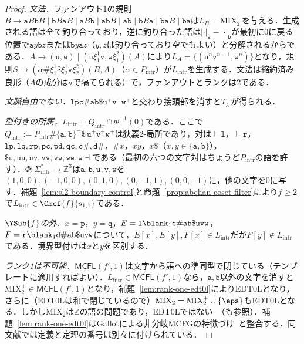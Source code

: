 \begin{proof}
\emph{文法．}ファンアウト1の規則$B\to\mathtt aB\mathtt bB\mid\mathtt bB\mathtt aB\mid\mathtt aB\mathtt b\mid\mathtt{ab}B\mid\mathtt{ab}\mid\mathtt bB\mathtt a\mid\mathtt{ba}B\mid\mathtt{ba}$は$L_B=\mathrm{MIX}_2^+$を与える．生成される語は全て釣り合っており，逆に釣り合った語は$|\cdot|_{\mathtt a}-|\cdot|_{\mathtt b}$が最初に0に戻る位置で$\mathtt ay\mathtt bz$または$\mathtt by\mathtt az$（$y,z$は釣り合っており空でもよい）と分解されるからである．$A\to(\mathtt u,\mathtt w)\mid(\mathtt u\xi_1^1\mathtt v,\mathtt w\xi_1^2)(A)$により$L_A=\{(\mathtt u^n\mathtt v^{n-1},\mathtt w^n)\}$となり，規則$S\to(\alpha\mathtt\#\xi_1^1\mathtt\$\xi_2^1\mathtt v\xi_2^2)(B,A)$（$\alpha\in P_{\mathrm{intr}}$）が$L_{\mathrm{intr}}$を生成する．文法は縮約済み良形（$A$の成分は$\mathtt v$で隔てられる）で，ファンアウトとランクは2である．

\emph{文脈自由でない．}$\mathtt{lpc\#ab\$}\mathtt u^+\mathtt v^+\mathtt w^+$と交わり接頭部を消すと$T_3^+$が得られる．

\emph{型付きの所属．}$L_{\mathrm{intr}}=Q_{\mathrm{intr}}\cap\Phi^{-1}(0)$である．ここで$Q_{\mathrm{intr}}:=P_{\mathrm{intr}}\mathtt\#\{\mathtt a,\mathtt b\}^+\mathtt\$\,\mathtt u^+\mathtt v^+\mathtt w^+$は狭義2-局所であり，対は$\vdash\mathtt l$，$\vdash\mathtt r$，$\mathtt{lp},\mathtt{lq},\mathtt{rp},\mathtt{pc},\mathtt{pd},\mathtt{qc},\mathtt{c\#},\mathtt{d\#}$，$\mathtt{\#}x$，$xy$，$x\mathtt\$$（$x,y\in\{\mathtt a,\mathtt b\}$），$\mathtt{\$u},\mathtt{uu},\mathtt{uv},\mathtt{vv},\mathtt{vw},\mathtt{ww},\mathtt w\dashv$である（最初の六つの文字対はちょうど$P_{\mathrm{intr}}$の語を許す）．$\Phi:\Sigma_{\mathrm{intr}}^*\to\mathbb Z^3$は$\mathtt a,\mathtt b,\mathtt u,\mathtt v,\mathtt w$を$(1,0,0),(-1,0,0),(0,1,0),(0,-1,1),(0,0,-1)$に，他の文字を$0$に写す．補題~\ref{lem:sl2-boundary-control}と命題~\ref{prop:abelian-coset-filter}により$f\ge2$で$L_{\mathrm{intr}}\in\Cmcf{f}{s_{1,1}}$である．

\emph{$\YSub{f}$の外．}$x=\mathtt p$，$y=\mathtt q$，$E=\mathtt l\blank_1\mathtt{c\#ab\$uvw}$，$F=\mathtt r\blank_1\mathtt{d\#ab\$uvw}$について，$E[x],E[y],F[x]\in L_{\mathrm{intr}}$だが$F[y]\notin L_{\mathrm{intr}}$である．境界型付けは$x$と$y$を区別する．

\emph{ランク1は不可能．}$\mathsf{MCFL}(f',1)$は文字から語への準同型で閉じている（テンプレートに適用すればよい）．$L_{\mathrm{intr}}\in\mathsf{MCFL}(f',1)$なら，$\mathtt a,\mathtt b$以外の文字を消すと$\mathrm{MIX}_2^+\in\mathsf{MCFL}(f',1)$となり，補題~\ref{lem:rank-one-edt0l}によりEDT0Lとなり，さらに（EDT0Lは和で閉じているので）$\mathrm{MIX}_2=\mathrm{MIX}_2^+\cup\{\eps\}$もEDT0Lとなる．しかし$\mathrm{MIX}_2$は$\mathbb Z$の語の問題であり，EDT0Lではない~\cite{BishopEtAl2026EDT0L}（\cite[Corollary~32]{Gallot2021}も参照）．補題~\ref{lem:rank-one-edt0l}はGallotによる非分岐MCFGの特徴づけ~\cite[Definition~38 and Theorems~28--29]{Gallot2021}と整合する．同文献では定義と定理の番号は別々に付けられている．
\end{proof}

